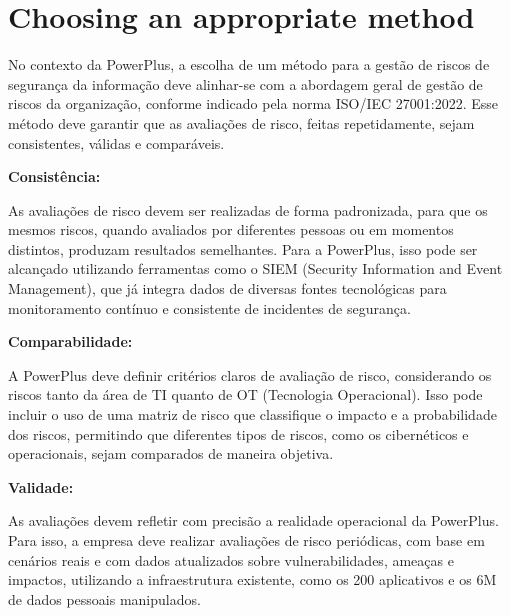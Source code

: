 \section{Choosing an appropriate method}

No contexto da PowerPlus, a escolha de um método para a gestão de riscos de segurança da informação deve alinhar-se com a abordagem geral de gestão de riscos da organização, conforme indicado pela norma ISO/IEC 27001:2022. Esse método deve garantir que as avaliações de risco, feitas repetidamente, sejam consistentes, válidas e comparáveis.

\textbf{Consistência:}

As avaliações de risco devem ser realizadas de forma padronizada, para que os mesmos riscos, quando avaliados por diferentes pessoas ou em momentos distintos, produzam resultados semelhantes. Para a PowerPlus, isso pode ser alcançado utilizando ferramentas como o SIEM (Security Information and Event Management), que já integra dados de diversas fontes tecnológicas para monitoramento contínuo e consistente de incidentes de segurança.

\textbf{Comparabilidade:}

A PowerPlus deve definir critérios claros de avaliação de risco, considerando os riscos tanto da área de TI quanto de OT (Tecnologia Operacional). Isso pode incluir o uso de uma matriz de risco que classifique o impacto e a probabilidade dos riscos, permitindo que diferentes tipos de riscos, como os cibernéticos e operacionais, sejam comparados de maneira objetiva.

\textbf{Validade:}

As avaliações devem refletir com precisão a realidade operacional da PowerPlus. Para isso, a empresa deve realizar avaliações de risco periódicas, com base em cenários reais e com dados atualizados sobre vulnerabilidades, ameaças e impactos, utilizando a infraestrutura existente, como os 200 aplicativos e os 6M de dados pessoais manipulados.

